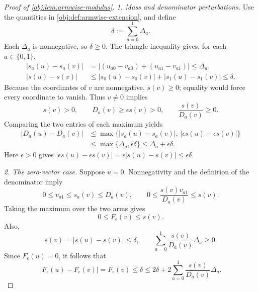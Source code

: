 \begin{proof}[Proof of \cref{obj:lem:armwise-modulus}]
\emph{1. Mass and denominator perturbations.}
Use the quantities in \cref{obj:def:armwise-extension}, and define
\[
\delta:=\sum_{a=0}^1\Delta_a.
\]
Each \(\Delta_a\) is nonnegative, so \(\delta\geq0\). The triangle inequality gives, for each \(a\in\{0,1\}\),
\[
\begin{aligned}
|s_a(u)-s_a(v)|
&=\bigl|(u_{a0}-v_{a0})+(u_{a1}-v_{a1})\bigr|
\leq\Delta_a,\\
|s(u)-s(v)|
&\leq |s_0(u)-s_0(v)|+|s_1(u)-s_1(v)|
\leq\delta.
\end{aligned}
\]
Because the coordinates of \(v\) are nonnegative, \(s(v)\geq0\); equality would force every coordinate to vanish. Thus \(v\neq0\) implies
\[
s(v)>0,\qquad
D_a(v)\geq\epsilon s(v)>0,\qquad
\frac{s(v)}{D_a(v)}\geq0.
\]
Comparing the two entries of each maximum yields
\[
\begin{aligned}
|D_a(u)-D_a(v)|
&\leq
\max\bigl\{|s_a(u)-s_a(v)|,\,
          |\epsilon s(u)-\epsilon s(v)|\bigr\}\\
&\leq\max\{\Delta_a,\epsilon\delta\}
\leq\Delta_a+\epsilon\delta.
\end{aligned}
\]
Here \(\epsilon>0\) gives
\(
|\epsilon s(u)-\epsilon s(v)|
=\epsilon|s(u)-s(v)|\leq\epsilon\delta
\).

\emph{2. The zero-vector case.}
Suppose \(u=0\). Nonnegativity and the definition of the denominator imply
\[
0\leq v_{a1}\leq s_a(v)\leq D_a(v),
\qquad
0\leq\frac{s(v)v_{a1}}{D_a(v)}\leq s(v).
\]
Taking the maximum over the two arms gives
\[
0\leq F_\epsilon(v)\leq s(v).
\]
Also,
\[
s(v)=|s(u)-s(v)|\leq\delta,
\qquad
\sum_{a=0}^1\frac{s(v)}{D_a(v)}\Delta_a\geq0.
\]
Since \(F_\epsilon(u)=0\), it follows that
\[
|F_\epsilon(u)-F_\epsilon(v)|
=F_\epsilon(v)
\leq\delta
\leq2\delta+
2\sum_{a=0}^1\frac{s(v)}{D_a(v)}\Delta_a.
\]


\end{proof}
